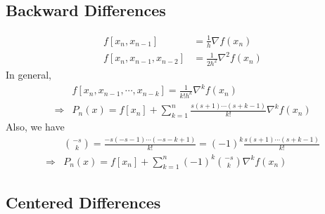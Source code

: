 \subsection{Backward Differences}
\begin{align*}
  f[x_n,x_{n-1}]&=\frac{1}{h}\nabla f(x_n) \\
  f[x_n,x_{n-1},x_{n-2}]&=\frac{1}{2h^2}\nabla^2f(x_n)
\end{align*}
In general,
\begin{align*}
  & f[x_n,x_{n-1},\cdots,x_{n-k}]=\frac{1}{k!h^k}\nabla^kf(x_n) \\
  \Rightarrow & P_n(x)=f[x_n]+\sum_{k=1}^{n}\frac{s(s+1)\cdots (s+k-1)}{k!}\nabla^kf(x_n)
\end{align*}
Also, we have
\begin{align*}
  & \binom{-s}{k}=\frac{-s(-s-1)\cdots (-s-k+1)}{k!}=(-1)^k\frac{s(s+1)\cdots (s+k-1)}{k!} \\
  \Rightarrow & P_n(x)=f[x_n]+\sum_{k=1}^{n}(-1)^k\binom{-s}{k}\nabla^kf(x_n)
\end{align*}

\subsection{Centered Differences}
